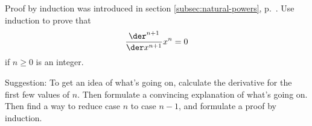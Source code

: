 Proof by induction was introduced in section \ref{subsec:natural-powers}, p.~\pageref{induction}.
Use induction to prove that
\begin{equation*}
  \frac{\der^{n+1}}{\der x^{n+1}} x^n = 0
\end{equation*}
if $n\ge0$ is an integer.

Suggestion: To get an idea of what's going on, calculate the derivative for the first few values of $n$.
Then formulate a convincing explanation of what's going on. Then find a way to reduce case $n$ to
case $n-1$, and formulate a proof by induction.
